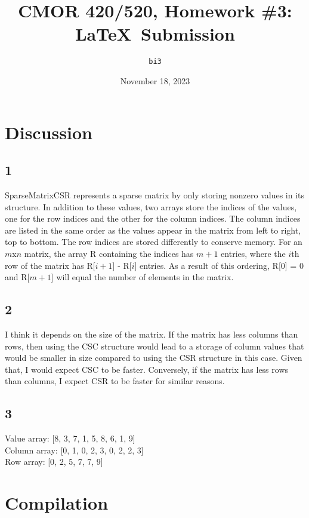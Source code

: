\documentclass{article}
\begin{document}
\title{CMOR 420\slash520, Homework \#3: \LaTeX\ Submission}
\author{\texttt{bi3}}
\date{November 18, 2023}
\maketitle

\section*{Discussion}

\subsection*{1}

SparseMatrixCSR represents a sparse matrix by only storing nonzero values in its structure. In addition to these values, two arrays store the indices of the values, one for the row indices and the other for the column indices. The column indices are listed in the same order as the values appear in the matrix from left to right, top to bottom. The row indices are stored differently to conserve memory. For an $m$x$n$ matrix, the array R containing the indices has $m+1$ entries, where the $i$th row of the matrix has R[$i+1$] - R[$i$] entries. As a result of this ordering, R[0] = 0 and R[$m+1$] will equal the number of elements in the matrix.

\subsection*{2}

I think it depends on the size of the matrix. If the matrix has less columns than rows, then using the CSC structure would lead to a storage of column values that would be smaller in size compared to using the CSR structure in this case. Given that, I would expect CSC to be faster. Conversely, if the matrix has less rows than columns, I expect CSR to be faster for similar reasons.

\subsection*{3}

Value array: [8, 3, 7, 1, 5, 8, 6, 1, 9]\\
Column array: [0, 1, 0, 2, 3, 0, 2, 2, 3]\\
Row array: [0, 2, 5, 7, 7, 9]

\section*{Compilation}
\end{document}
